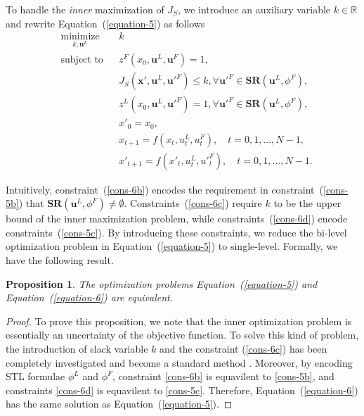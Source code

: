 \documentclass[letterpaper, 10 pt, conference]{ieeeconf}
\newtheorem{proposition}{\bf Proposition}
\begin{document}
To handle the \emph{inner} maximization of $J_S$, we introduce an auxiliary variable $k\in \mathbb{R}$ and rewrite Equation~(\ref{equation-5}) as follows\vspace{-15pt}
\begin{subequations}\label{equation-6}
\begin{align}
& \underset{k,\mathbf{u}^L}{\text{minimize}} & & k \\
& \text{subject to} & & z^F(x_0,\mathbf{u}^L,\mathbf{u}^F)=1, \label{cons-6b} \\
& & & \!\!\!\!\! 
J_S(\mathbf{x}', \mathbf{u}^L, \mathbf{u}'^F) \leq k,\forall \mathbf{u}'^F \!\in \mathbf{SR}(\mathbf{u}^L, \phi^F), \label{cons-6c} \\
& & & 
\!\!\!\!\!z^L(x_0,\mathbf{u}^L,\mathbf{u}'^F)=1, \forall \mathbf{u}'^F \!\in \mathbf{SR}(\mathbf{u}^L, \phi^F), \label{cons-6d} \\
& & & x'_0=x_0, \nonumber \\
& & & x_{t+1} = f(x_t, u^L_t, u^F_t), \quad t = 0, 1, \dots, N-1, \nonumber \\
& & & x'_{t+1} = f(x'_t, u^L_t, u'^F_t), \quad t = 0, 1, \dots, N-1. \nonumber
\end{align}  
\end{subequations}
 

Intuitively, constraint~(\ref{cons-6b}) encodes the requirement in constraint~(\ref{cons-5b}) that $\mathbf{SR}(\mathbf{u}^L, \phi^F) \ne \emptyset$. Constraints~(\ref{cons-6c}) require $k$ to be the upper bound of the inner maximization problem, while constraints~(\ref{cons-6d}) encode constraints~(\ref{cons-5c}). 
By introducing these constraints, we reduce the bi-level optimization problem in Equation~(\ref{equation-5}) to single-level. Formally, we have the following result.
\begin{proposition}
The optimization problems Equation~(\ref{equation-5}) and Equation~(\ref{equation-6}) are equivalent.
\end{proposition}

\begin{proof}
    To prove this proposition, we note that the inner optimization problem is essentially an uncertainty of the objective function. To solve this kind of problem, the introduction of slack variable $k$ and the constraint (\ref{cons-6c}) has been completely investigated and become a standard method \cite{sim2004robust}. 
    Moreover, by encoding STL formulae $\phi^L$ and $\phi^F$, constraint \ref{cons-6b} is equavilent to \ref{cons-5b}, and constraints \ref{cons-6d} is equavilent to \ref{cons-5c}.
    Therefore, Equation~(\ref{equation-6}) has the same solution as Equation~(\ref{equation-5}). 
\end{proof}
\end{document}
